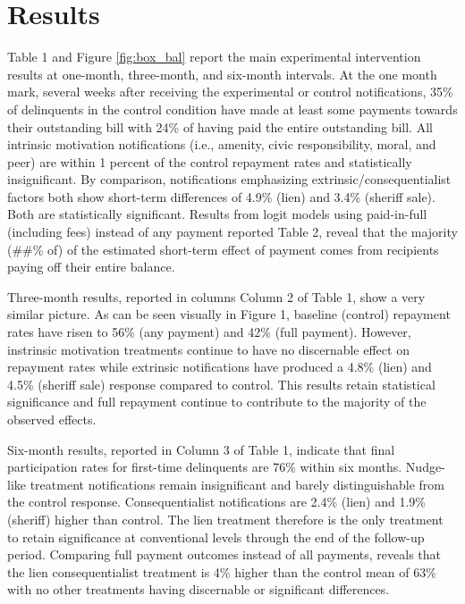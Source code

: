 \documentclass[12pt,titlepage]{article}
\begin{document}
\section{Results}

Table 1 and Figure \ref{fig:box_bal} report the main experimental intervention results 
at one-month, three-month, and six-month intervals. At the one month mark, 
several weeks after receiving the experimental or control notifications, 
35\% of delinquents in the control condition have made at least some payments 
towards their outstanding bill with 24\% of having paid the entire outstanding 
bill. All intrinsic motivation notifications (i.e., amenity, civic responsibility, 
moral, and peer) are within 1 percent of the control repayment rates and 
statistically insignificant. By comparison, notifications emphasizing 
extrinsic/consequentialist factors both show short-term differences of 
4.9\% (lien) and 3.4\% (sheriff sale). Both are statistically significant. 
Results from logit models using paid-in-full (including fees) instead of any 
payment reported Table 2, reveal that the majority (\#\#\% of) of the estimated 
short-term effect of payment comes from recipients paying off their entire balance.

Three-month results, reported in columns Column 2 of Table 1, show a very 
similar picture. As can be seen visually in Figure 1, baseline (control) 
repayment rates have risen to 56\% (any payment) and 42\% (full payment). 
However, instrinsic motivation treatments continue to have no discernable 
effect on repayment rates while extrinsic notifications have produced a 
4.8\% (lien) and 4.5\% (sheriff sale) response compared to control. This 
results retain statistical significance and full repayment continue to 
contribute to the majority of the observed effects.

Six-month results, reported in Column 3 of Table 1, indicate that final 
participation rates for first-time delinquents are 76\% within six months. 
Nudge-like treatment notifications remain insignificant and barely 
distinguishable from the control response. Consequentialist notifications 
are 2.4\% (lien) and 1.9\% (sheriff) higher than control. The lien treatment 
therefore is the only treatment to retain significance at conventional 
levels through the end of the follow-up period. Comparing full payment 
outcomes instead of all payments, reveals that the lien consequentialist 
treatment is 4\% higher than the control mean of 63\% with no other 
treatments having discernable or significant differences.
\end{document}

